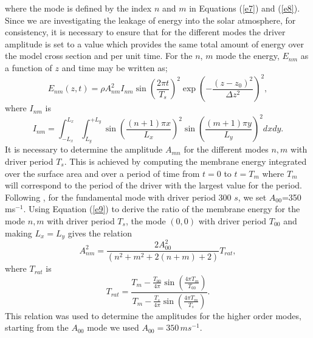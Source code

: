 \documentclass[preprint,authoryear,12pt]{elsarticle}
\begin{document}
where the mode is defined by the index $n$ and $m$ in Equations (\ref{e7}) and (\ref{e8}). Since we are investigating the leakage of energy into the solar atmosphere, for consistency, it is necessary to ensure that for the different modes the driver amplitude is set to a value which provides the same total amount of energy over the model cross section and per unit time. For the $n$, $m$ mode the energy, $E_{nm}$ as a function of $z$ and time may be written as;
\begin{equation}
E_{nm}(z,t)= \rho A_{nm}^{2} I_{nm}  \sin{\left(\frac{2\pi t}{T_s} \right)}^2
\exp{\left( -\frac{(z-z_0)^2}{\Delta z^{2}} \right)}^2,
\label{e9}
\end{equation}
where $I_{nm}$ is
$$
I_{nm}= \int_{-L_{x}}^{L_{x}} \int_{L_{y}}^{+L_{y}} \sin{\left(\frac{(n+1)\pi x}{L_x} \right)}^{2}   \sin{\left(  \frac{(m+1)\pi y}{L_y} \right)}^{2}dxdy. 
$$
It is necessary to determine the amplitude $A_{mn}$ for the different modes $n, m$ with driver period 
$T_{s}$. This is achieved by computing the membrane energy integrated over the surface area and 
over a period of time from $t=0$ to $t=T_{m}$ where $T_m$ will correspond to the period of the driver 
with the largest value for the period. Following  \citet{Leighton1960}, for the fundamental mode with 
driver period 300 $s$, we set $A_{00}$=350\, ms$^{-1}$. 
Using Equation (\ref{e9}) to derive the ratio of the membrane energy for the mode $n, m$ with 
driver period $T_{s}$, the mode $(0, 0)$ with driver period $T_{00}$ and making $L_x=L_y$ 
gives the relation
\begin{equation}
A_{nm}^{2}=\frac{2A_{00}^{2}}{(n^2+m^2+2(n+m)+2)}T_{rat},
\label{e10}
\end{equation}
where $T_{rat}$ is
$$
T_{rat}=
\frac{T_m-\frac{T_{00}}{4\pi}   \sin(\frac{4\pi T_m}{T_{00}})    }{T_m-\frac{T_{s}}{4\pi}   \sin(\frac{4\pi T_m}{T_{s}})}. 
$$
This relation was used to determine the amplitudes for the higher order modes, starting from the $A_{00}$ mode we used  $A_{00}=350\, ms^{-1}$.
\end{document}
